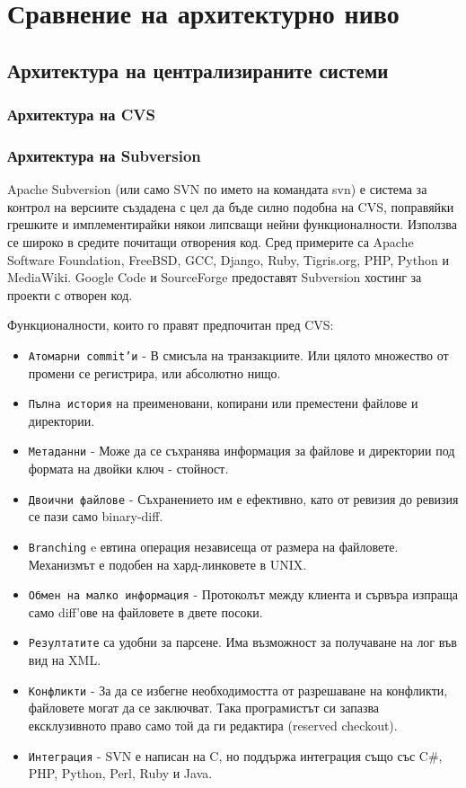 \documentclass[a4paper]{article}
\begin{document}
\section{Сравнение на архитектурно ниво}
  \subsection{Архитектура на централизираните системи}
    \subsubsection{Архитектура на CVS}
    \subsubsection{Архитектура на Subversion}
    
    Apache Subversion (или само SVN по името на командата svn) е система за контрол на версиите създадена с цел да бъде силно подобна на CVS, поправяйки грешките и имплементирайки някои липсващи нейни функционалности. Използва се широко в средите почитащи отворения код. Сред примерите са Apache Software Foundation, FreeBSD, GCC, Django, Ruby, Tigris.org, PHP, Python и MediaWiki. Google Code и SourceForge предоставят Subversion хостинг за проекти с отворен код.

    Функционалности, които го правят предпочитан пред CVS:
    \begin{itemize}
      \item \texttt{Атомарни commit'и} - В смисъла на транзакциите. Или цялото множество от промени се регистрира, или абсолютно нищо.
      \item \texttt{Пълна история} на преименовани, копирани или преместени файлове и директории.
      \item \texttt{Метаданни} - Може да се съхранява информация за файлове и директории под формата на двойки ключ - стойност.
      \item \texttt{Двоични файлове} - Съхранението им е ефективно, като от ревизия до ревизия се пази само binary-diff.
      \item \texttt{Branching} e евтина операция независеща от размера на файловете. Механизмът е подобен на хард-линковете в UNIX.
      \item \texttt{Обмен на малко информация} - Протоколът между клиента и сървъра изпраща само diff'ове на файловете в двете посоки.
      \item \texttt{Резултатите} са удобни за парсене. Има възможност за получаване на лог във вид на XML.
      \item \texttt{Конфликти} - За да се избегне необходимостта от разрешаване на конфликти, файловете могат да се заключват. Така програмистът си запазва ексклузивното право само той да ги редактира (reserved checkout).
      \item \texttt{Интеграция} - SVN е написан на C, но поддържа интеграция също със C\#, PHP, Python, Perl, Ruby и Java.
    \end{itemize}
\end{document}
